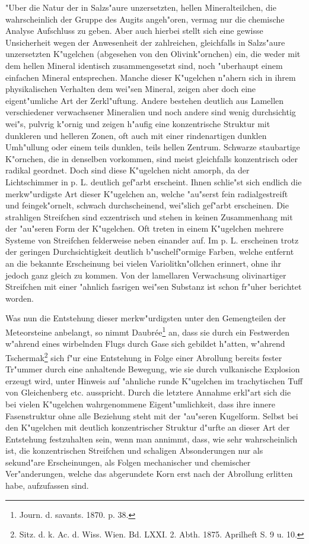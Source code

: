 \documentclass[a4paper, 11pt, oneside]{article}
\begin{document}
"Uber die Natur der in Salzs"aure unzersetzten, hellen Mineralteilchen, die wahrscheinlich der Gruppe des Augits angeh"oren, vermag nur die chemische Analyse Aufschluss zu geben. Aber auch hierbei stellt sich eine gewisse Unsicherheit wegen der Anwesenheit der zahlreichen, gleichfalls in Salzs"aure unzersetzten K"ugelchen (abgesehen von den Olivink"ornchen) ein, die weder mit dem hellen Mineral identisch zusammengesetzt sind, noch "uberhaupt einem einfachen Mineral entsprechen. Manche dieser K"ugelchen n"ahern sich in ihrem physikalischen Verhalten dem wei"sen Mineral, zeigen aber doch eine eigent"umliche Art der Zerkl"uftung. Andere bestehen deutlich aus Lamellen verschiedener verwachsener Mineralien und noch andere sind wenig durchsichtig wei"s, pulvrig k"ornig und zeigen h"aufig eine konzentrische Struktur mit dunkleren und helleren Zonen, oft auch mit einer rindenartigen dunklen Umh"ullung oder einem teils dunklen, teils hellen Zentrum. Schwarze staubartige K"ornchen, die in denselben vorkommen, sind meist gleichfalls konzentrisch oder radikal geordnet. Doch sind diese K"ugelchen nicht amorph, da der Lichtschimmer in p. L. deutlich gef"arbt erscheint. Ihnen schlie"st sich endlich die merkw"urdigste Art dieser K"ugelchen an, welche "au"serst fein radialgestreift und feingek"ornelt, schwach durchscheinend, wei"slich gef"arbt erscheinen. Die strahligen Streifchen sind exzentrisch und stehen in keinen Zusammenhang mit der "au"seren Form der K"ugelchen. Oft treten in einem K"ugelchen mehrere Systeme von Streifchen felderweise neben einander auf. Im p. L. erscheinen trotz der geringen Durchsichtigkeit deutlich b"uschelf"ormige Farben, welche entfernt an die bekannte Erscheinung bei vielen Variolitkn"ollchen erinnert, ohne ihr jedoch ganz gleich zu kommen. Von der lamellaren Verwachsung olivinartiger Streifchen mit einer "ahnlich fasrigen wei"sen Substanz ist schon fr"uher berichtet worden.

Was nun die Entstehung dieser merkw"urdigsten unter den Gemengteilen der Meteorsteine anbelangt, so nimmt Daubrée\footnote{Journ. d. savants. 1870. p. 38.} an, dass sie durch ein Festwerden w"ahrend eines wirbelnden Flugs durch Gase sich gebildet h"atten, w"ahrend Tschermak\footnote{Sitz. d. k. Ac. d. Wiss. Wien. Bd. LXXI. 2. Abth. 1875. Aprilheft S. 9 u. 10.} sich f"ur eine Entstehung in Folge einer Abrollung bereits fester Tr"ummer durch eine anhaltende Bewegung, wie sie durch vulkanische Explosion erzeugt wird, unter Hinweis auf "ahnliche runde K"ugelchen im trachytischen Tuff von Gleichenberg etc. ausspricht. Durch die letztere Annahme erkl"art sich die bei vielen K"ugelchen wahrgenommene Eigent"umlichkeit, dass ihre innere Fasenstruktur ohne alle Beziehung steht mit der "au"seren Kugelform. Selbst bei den K"ugelchen mit deutlich konzentrischer Struktur d"urfte an dieser Art der Entstehung festzuhalten sein, wenn man annimmt, dass, wie sehr wahrscheinlich ist, die konzentrischen Streifchen und schaligen Absonderungen nur als sekund"are Erscheinungen, als Folgen mechanischer und chemischer Ver"anderungen, welche das abgerundete Korn erst nach der Abrollung erlitten habe, aufzufassen sind.
\end{document}
